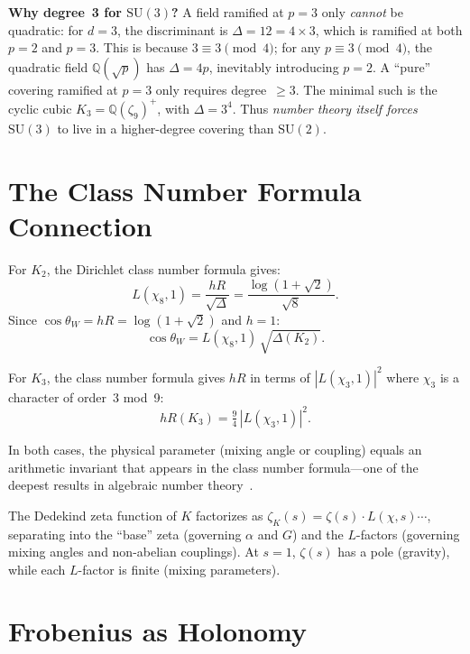 \documentclass[aps,prl,twocolumn,superscriptaddress,nofootinbib]{revtex4-2}
\newcommand{\SU}{\mathrm{SU}}
\begin{document}
\medskip
\noindent\textbf{Why degree~3 for $\SU(3)$?}
A field ramified at $p=3$ only \emph{cannot} be quadratic: for
$d=3$, the discriminant is $\Delta=12=4\times 3$, which is ramified
at both $p=2$ and $p=3$.  This is because $3\equiv 3\pmod{4}$;
for any $p\equiv 3\pmod{4}$, the quadratic field
$\mathbb{Q}(\sqrt{p})$ has $\Delta=4p$, inevitably introducing
$p=2$.  A ``pure'' covering ramified at $p=3$ only requires
degree~$\geq 3$.  The minimal such is the cyclic cubic
$K_3=\mathbb{Q}(\zeta_9)^+$, with $\Delta=3^4$.  Thus
\emph{number theory itself forces} $\SU(3)$ to live in a
higher-degree covering than $\SU(2)$.

\section{The Class Number Formula Connection}

For $K_2$, the Dirichlet class number formula gives:
\begin{equation}\label{eq:classK2}
  L(\chi_8, 1) = \frac{hR}{\sqrt{\Delta}}
  = \frac{\log(1{+}\sqrt{2})}{\sqrt{8}}.
\end{equation}
Since $\cos\theta_W=hR=\log(1{+}\sqrt{2})$ and $h=1$:
\begin{equation}
  \cos\theta_W = L(\chi_8, 1)\,\sqrt{\Delta(K_2)}.
\end{equation}

For $K_3$, the class number formula gives $hR$ in terms of
$|L(\chi_3,1)|^2$ where $\chi_3$ is a character of order~3 mod~9:
\begin{equation}
  hR(K_3) = \tfrac{9}{4}\,|L(\chi_3,1)|^2.
\end{equation}

In both cases, the physical parameter (mixing angle or coupling)
equals an arithmetic invariant that appears in the class number
formula---one of the deepest results in algebraic number
theory~\cite{Dirichlet1837}.

The Dedekind zeta function of $K$ factorizes as
$\zeta_K(s)=\zeta(s)\cdot L(\chi,s)\cdots$, separating into the
``base'' zeta (governing $\alpha$ and $G$) and the $L$-factors
(governing mixing angles and non-abelian couplings).  At $s=1$,
$\zeta(s)$ has a pole (gravity), while each $L$-factor is finite
(mixing parameters).

\section{Frobenius as Holonomy}
\end{document}
